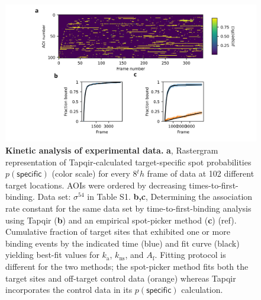 \begin{figure}[h]
\centering
\includegraphics[width=183mm]{figures/figure7/figure7.png}
\caption{\textbf{Kinetic analysis of experimental data.}   \textbf{a}, Rastergram representation of Tapqir-calculated target-specific spot  probabilities $p(\mathsf{specific})$ (color scale) for every 8$^th$ frame of data at 102 different target locations.  AOIs were ordered by decreasing times-to-first-binding. Data set: $\sigma^{54}$ in Table S1. \textbf{b,c}, Determining the association rate constant for the same data set by  time-to-first-binding analysis using Tapqir (\textbf{b}) and an empirical spot-picker method (\textbf{c}) (ref).   Cumulative fraction of target sites that exhibited one or more binding events by the indicated time (blue) and fit curve (black) yielding best-fit values for $k_\mathrm{a}$, $k_\mathrm{ns}$, and $A_\mathrm{f}$. Fitting protocol is different for the two methods; the spot-picker method fits both the target sites and off-target control data (orange) whereas Tapqir incorporates the control data in its $p(\mathsf{specific})$ calculation.
}
\label{fig:experimental_data}
\end{figure}